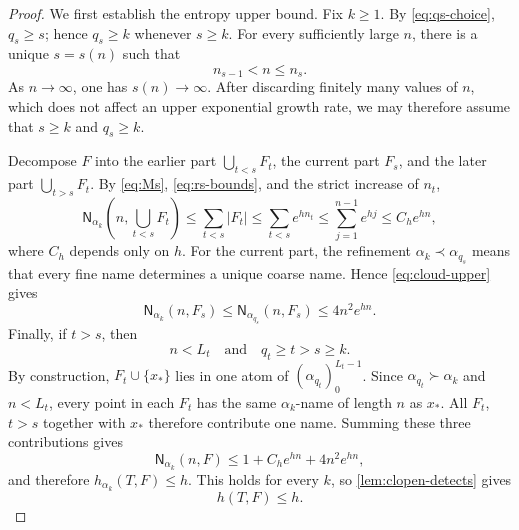 \documentclass[12pt,letterpaper,reqno]{amsart}
\newcommand{\Nname}{\mathsf N}
\theoremstyle{definition}
\theoremstyle{remark}
\numberwithin{equation}{section}
\begin{document}
\begin{proof}
		We first establish the entropy upper bound.  Fix $k\geq1$.  By
		\eqref{eq:qs-choice}, $q_s\geq s$; hence $q_s\geq k$ whenever $s\geq k$.
		For every sufficiently large $n$, there is a unique $s=s(n)$ such that
		\begin{equation}
			n_{s-1}<n\leq n_s.
			\label{eq:stage-containing-n}
		\end{equation}
		As $n\to\infty$, one has $s(n)\to\infty$.  After discarding finitely many
		values of $n$, which does not affect an upper exponential growth rate, we may
		therefore assume that $s\geq k$ and $q_s\geq k$.

		Decompose $F$ into the earlier part $\bigcup_{t<s}F_t$, the current part $F_s$, and the later part $\bigcup_{t>s}F_t$.  
		By
		\eqref{eq:Ms}, \eqref{eq:rs-bounds}, and the strict increase of 
		$n_t$,
		\[
		\Nname_{\alpha_k}\left(n,\bigcup_{t<s}F_t\right)
		\leq\sum_{t<s}|F_t|
		\leq
		\sum_{t<s}e^{hn_t}
		\leq
		\sum_{j=1}^{n-1}e^{hj}
		\leq C_he^{hn},
		\]
		where $C_h$ depends only on $h$.  For the current part, the refinement
		$\alpha_k\prec\alpha_{q_s}$ means that every fine name determines a unique
		coarse name.  Hence \eqref{eq:cloud-upper} gives
		\begin{equation}
			\Nname_{\alpha_k}(n,F_s)
			\leq
			\Nname_{\alpha_{q_s}}(n,F_s)
			\leq4n^2e^{hn}.
			\label{eq:current-cloud-upper}
		\end{equation}
		Finally, if $t>s$, then
		\[
			n<L_t\quad\text{and}\quad q_t\geq t>s\geq k.
		\]
		By construction, $F_t\cup\{x_*\}$ lies in one atom of
		$(\alpha_{q_t})_0^{L_t-1}$.  Since $\alpha_{q_t} \succ \alpha_k$ and
		$n<L_t$, every point in each $F_t$ has the same
		$\alpha_k$-name of length $n$ as $x_*$.  All $F_t$, $t>s$  together with $x_*$ therefore
		contribute one name.  Summing these three contributions gives
		\begin{equation}
			\Nname_{\alpha_k}(n,F)
			\leq
			1+C_he^{hn}+4n^2e^{hn},
			\label{eq:global-upper}
		\end{equation}
		and therefore
		$h_{\alpha_k}(T,F)\leq h$.  This holds for every $k$, so
		\cref{lem:clopen-detects} gives
		\begin{equation}
			h(T,F)\leq h.
			\label{eq:entropy-upper}
		\end{equation}
		

\end{proof}
\end{document}
